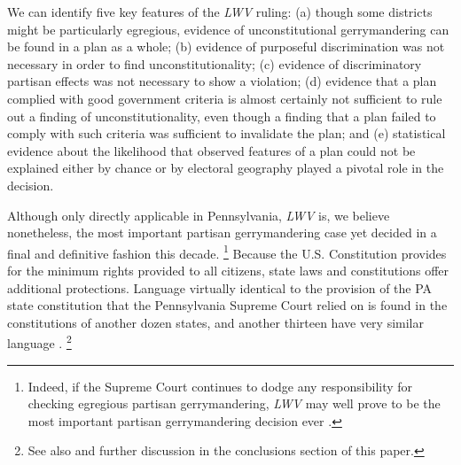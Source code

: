 \par
    We can identify five key features of the \textit{LWV} ruling: (a) though some districts might be particularly egregious, evidence of unconstitutional gerrymandering can be found in a plan as a whole; (b) evidence of purposeful discrimination was not necessary in order to find unconstitutionality; (c) evidence of discriminatory partisan effects was not necessary to show a violation; (d) evidence that a plan complied with good government criteria is almost certainly not sufficient to rule out a finding of unconstitutionality, even though a finding that a plan failed to comply with such criteria was sufficient to invalidate the plan; and (e) statistical evidence about the likelihood that observed features of a plan could not be explained either by chance or by electoral geography played a pivotal role in the decision. 
\par
    Although only directly applicable in Pennsylvania, \textit{LWV} is, we believe nonetheless, the most important partisan gerrymandering case yet decided in a final and definitive fashion this decade. 
        \footnote{Indeed, if the Supreme Court continues to dodge any responsibility for checking egregious partisan gerrymandering, \textit{LWV} may well prove to be the most important partisan gerrymandering decision ever \citep{Grofman_Cervas_2018_ELJ}.}
    Because the U.S. Constitution provides for the minimum rights provided to all citizens, state laws and constitutions offer additional protections. Language virtually identical to the provision of the PA state constitution that the Pennsylvania Supreme Court relied on is found in the constitutions of another dozen states, and another thirteen have very similar language \citep{Douglas2014_RightToVote}.
        \footnote{See also \citet{Elmendorf2018} and further discussion in the conclusions section of this paper.}
